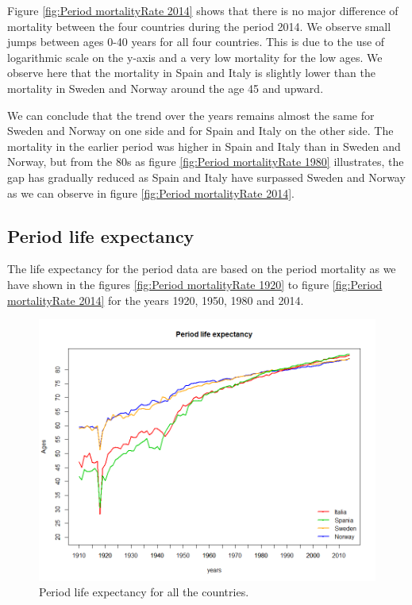 Figure \ref{fig:Period mortalityRate 2014} shows that there is no major difference of mortality between the four countries during the period 2014. 
We observe small jumps between ages 0-40 years for all four countries.
This is due to the use of logarithmic scale on the y-axis and a very low mortality for the low ages.
We observe here that the mortality in Spain and Italy is slightly lower than the mortality in Sweden and Norway around the age 45 and upward.

We can conclude that the trend over the years remains almost the same for Sweden and Norway on one side and for Spain and Italy on the other side.
The mortality in the earlier period was higher in Spain and Italy than in Sweden and Norway, but from the 80s as figure  \ref{fig:Period mortalityRate 1980} illustrates, the gap has gradually reduced as Spain and Italy have surpassed Sweden and Norway as we can observe in figure \ref{fig:Period mortalityRate 2014}. 




\subsection{Period life expectancy}            
 
The life expectancy for the period data are based on the period mortality as we have shown in the figures \ref{fig:Period mortalityRate 1920} to figure \ref{fig:Period mortalityRate 2014} for the years 1920, 1950, 1980 and 2014.            
            \begin{figure}[t]
             \centering
              \includegraphics[width=0.8\linewidth]{figures/periodLifeExpectancy_allCountries3.png}
              \caption{Period life expectancy for all the countries.}
              \label{fig:periodLifeExpect all}
            \end{figure}    
            
